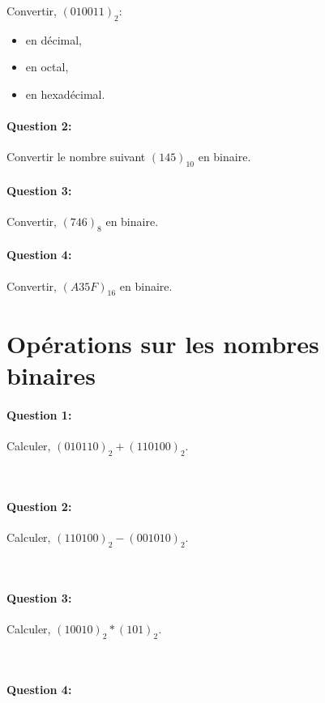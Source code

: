 Convertir, $(010011)_{2}$:
\begin{itemize}
 \item en décimal,
 \item en octal,
 \item en hexadécimal.
\end{itemize}

\paragraph{Question 2:}

Convertir le nombre suivant $(145)_{10}$ en binaire.

\paragraph{Question 3:}

Convertir, $(746)_{8}$ en binaire.

\paragraph{Question 4:}

Convertir, $(A35F)_{16}$ en binaire.

\section{Opérations sur les nombres binaires}

\paragraph{Question 1:}

Calculer, $(010110)_{2}+(110100)_{2}$.

~\

\paragraph{Question 2:}

Calculer, $(110100)_{2}-(001010)_{2}$.

~\

\paragraph{Question 3:}

Calculer, $(10010)_{2}*(101)_{2}$.

~\

\paragraph{Question 4:}

